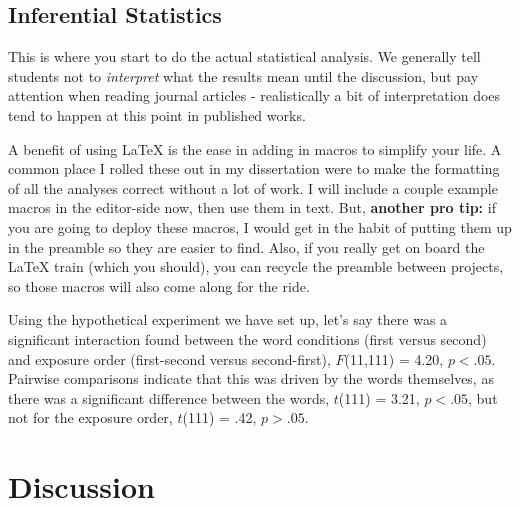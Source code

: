 \documentclass[stu,12pt,floatsintext]{apa7}
\begin{document}
\subsection{Inferential Statistics}

This is where you start to do the actual statistical analysis. We generally tell students not to \textit{interpret} what the results mean until the discussion, but pay attention when reading journal articles - realistically a bit of interpretation does tend to happen at this point in published works.

A benefit of using \LaTeX{} is the ease in adding in macros to simplify your life. A common place I rolled these out in my dissertation were to make the formatting of all the analyses correct without a lot of work. I will include a couple example macros in the editor-side now, then use them in text. But, \textbf{another pro tip:} if you are going to deploy these macros, I would get in the habit of putting them up in the preamble so they are easier to find. Also, if you really get on board the \LaTeX{} train (which you should), you can recycle the preamble between projects, so those macros will also come along for the ride.

\newcommand{\ttestSig}[2]{$t$(#1) = #2, $p < .05$}
\newcommand{\ttestInsig}[2]{$t$(#1) = #2, $p > .05$}
\newcommand{\anovaSig}[3]{$F$(#1,#2) = #3, $p < .05$}
\newcommand{\anovaInsig}[3]{$F$(#1,#2) = #3, $p > .05$}

Using the hypothetical experiment we have set up, let's say there was a significant interaction found between the word conditions (first versus second) and exposure order (first-second versus second-first), \anovaSig{11}{111}{4.20}. Pairwise comparisons indicate that this was driven by the words themselves, as there was a significant difference between the words, \ttestSig{111}{3.21}, but not for the exposure order, \ttestInsig{111}{.42}.

\section{Discussion}
\end{document}
